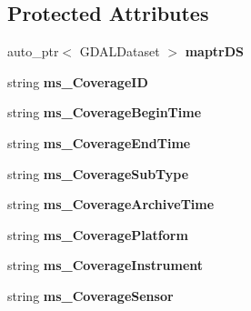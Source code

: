 \subsection*{Protected Attributes}
\begin{DoxyCompactItemize}
\item 
\hypertarget{classAbstractDataset_a0a7aa031c18bc61b12eb8e23a0852ade}{
auto\_\-ptr$<$ GDALDataset $>$ {\bfseries maptrDS}}
\label{classAbstractDataset_a0a7aa031c18bc61b12eb8e23a0852ade}

\item 
\hypertarget{classAbstractDataset_ad241c44de1a16de00a88195bb3b08deb}{
string {\bfseries ms\_\-CoverageID}}
\label{classAbstractDataset_ad241c44de1a16de00a88195bb3b08deb}

\item 
\hypertarget{classAbstractDataset_a5f3f63f66c91ce61213ae966ed0a593b}{
string {\bfseries ms\_\-CoverageBeginTime}}
\label{classAbstractDataset_a5f3f63f66c91ce61213ae966ed0a593b}

\item 
\hypertarget{classAbstractDataset_a2bf942bae502e9b9a02ee8b5cc4d4fb7}{
string {\bfseries ms\_\-CoverageEndTime}}
\label{classAbstractDataset_a2bf942bae502e9b9a02ee8b5cc4d4fb7}

\item 
\hypertarget{classAbstractDataset_ac8fd3b9fb9f9e1d8921e2cde2c75ecaf}{
string {\bfseries ms\_\-CoverageSubType}}
\label{classAbstractDataset_ac8fd3b9fb9f9e1d8921e2cde2c75ecaf}

\item 
\hypertarget{classAbstractDataset_a603719678668fef176a65bd33d426d0b}{
string {\bfseries ms\_\-CoverageArchiveTime}}
\label{classAbstractDataset_a603719678668fef176a65bd33d426d0b}

\item 
\hypertarget{classAbstractDataset_ad7f7925c2866e662f75ff10364d01ba6}{
string {\bfseries ms\_\-CoveragePlatform}}
\label{classAbstractDataset_ad7f7925c2866e662f75ff10364d01ba6}

\item 
\hypertarget{classAbstractDataset_afe2f6a655cd353db5c0e111ef2690edf}{
string {\bfseries ms\_\-CoverageInstrument}}
\label{classAbstractDataset_afe2f6a655cd353db5c0e111ef2690edf}

\item 
\hypertarget{classAbstractDataset_a23ea7b2d8b63056c481ec42014db4c4c}{
string {\bfseries ms\_\-CoverageSensor}}
\label{classAbstractDataset_a23ea7b2d8b63056c481ec42014db4c4c}


\end{DoxyCompactItemize}
